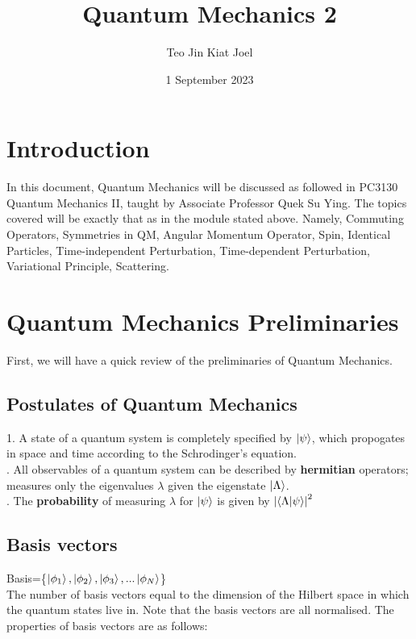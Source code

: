 \documentclass{article}
\title{Quantum Mechanics 2}
\author{Teo Jin Kiat Joel}
\date{1 September 2023}
\begin{document}
\maketitle

\begin{flushleft}

\hypersetup{}
\tableofcontents

\pagebreak
\section{Introduction}
In this document, Quantum Mechanics will be discussed as followed in PC3130 Quantum Mechanics II, taught by Associate Professor Quek Su Ying. The topics covered will be exactly that as in the module stated above. Namely, Commuting Operators, Symmetries in QM, Angular Momentum Operator, Spin, Identical Particles, Time-independent Perturbation, Time-dependent Perturbation, Variational Principle, Scattering.

\section{Quantum Mechanics Preliminaries}
First, we will have a quick review of the preliminaries of Quantum Mechanics.\\

\subsection{Postulates of Quantum Mechanics}
1. A state of a quantum system is completely specified by $\ket{\psi}$, which propogates in space and time according to the Schrodinger's equation.\\

. All observables of a quantum system can be described by \textbf{hermitian} operators; measures only the eigenvalues $\lambda$ given the eigenstate $\ket{\Lambda}$.\\

. The \textbf{probability} of measuring $\lambda$ for $\ket{\psi}$ is given by $\abs{\bra{\Lambda}\ket{\psi}}^2$

\subsection{Basis vectors}
Basis=\{$\ket{\phi_1},\ket{\phi_2},\ket{\phi_3},...\ket{\phi_N}$\}\\

The number of basis vectors equal to the dimension of the Hilbert space in which the quantum states live in. Note that the basis vectors are all normalised. The properties of basis vectors are as follows:\\[0.5cm]


\end{flushleft}
\end{document}
